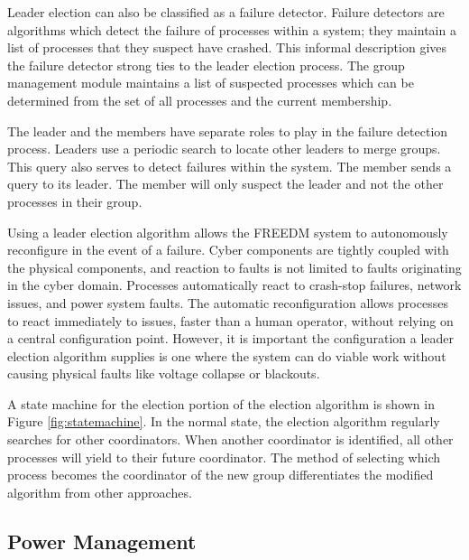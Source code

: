 Leader election can also be classified as a failure detector\cite{LEADERELECTIONEVAL}.
Failure detectors are algorithms which detect the failure of processes within a system; they maintain a list of processes that they suspect have crashed.
This informal description gives the failure detector strong ties to the leader election process. 
The group management module maintains a list of suspected processes which can be determined from the set of all processes and the current membership.

The leader and the members have separate roles to play in the failure detection process.
Leaders use a periodic search to locate other leaders to merge groups.
This query also serves to detect failures within the system.
The member sends a query to its leader.
The member will only suspect the leader and not the other processes in their group.

Using a leader election algorithm allows the \ac{FREEDM} system to autonomously reconfigure in the event of a failure.
Cyber components are tightly coupled with the physical components, and reaction to faults is not limited to faults originating in the cyber domain.
Processes automatically react to crash-stop failures, network issues, and power system faults.
The automatic reconfiguration allows processes to react immediately to issues, faster than a human operator, without relying on a central configuration point.
However, it is important the configuration a leader election algorithm supplies is one where the system can do viable work without causing physical faults like voltage collapse or blackouts\cite{HARINI}.

A state machine for the election portion of the election algorithm is shown in Figure \ref{fig:statemachine}.
In the normal state, the election algorithm regularly searches for other coordinators.
When another coordinator is identified, all other processes will yield to their future coordinator.
The method of selecting which process becomes the coordinator of the new group differentiates the modified algorithm from other approaches.

\subsection{Power Management}


